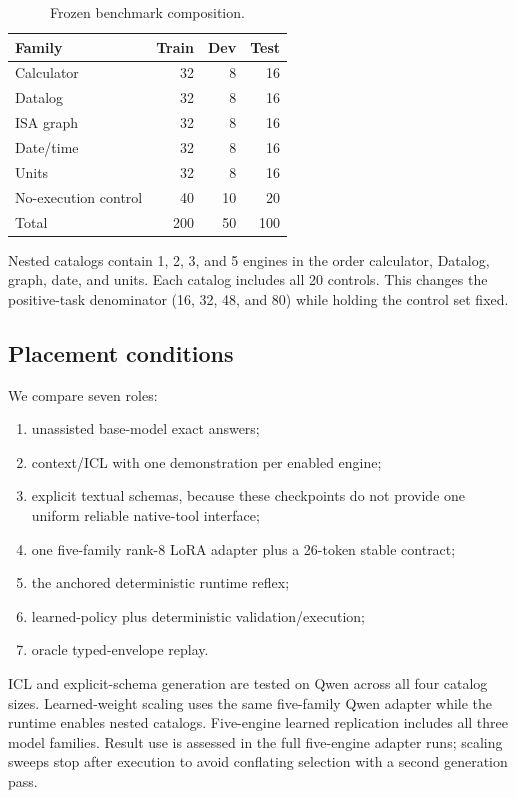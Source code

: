 \documentclass[10pt]{article}
\begin{document}
\begin{table}[ht]
\centering
\caption{Frozen benchmark composition.}
\label{tab:data}
\begin{tabular}{lrrr}
\toprule
Family & Train & Dev & Test \\
\midrule
Calculator & 32 & 8 & 16 \\
Datalog & 32 & 8 & 16 \\
ISA graph & 32 & 8 & 16 \\
Date/time & 32 & 8 & 16 \\
Units & 32 & 8 & 16 \\
No-execution control & 40 & 10 & 20 \\
\midrule
Total & 200 & 50 & 100 \\
\bottomrule
\end{tabular}
\end{table}

Nested catalogs contain 1, 2, 3, and 5 engines in the order calculator,
Datalog, graph, date, and units.  Each catalog includes all 20 controls.  This
changes the positive-task denominator (16, 32, 48, and 80) while holding the
control set fixed.

\subsection{Placement conditions}

We compare seven roles:

\begin{enumerate}
\item unassisted base-model exact answers;
\item context/ICL with one demonstration per enabled engine;
\item explicit textual schemas, because these checkpoints do not provide one
      uniform reliable native-tool interface;
\item one five-family rank-8 LoRA adapter plus a 26-token stable contract;
\item the anchored deterministic runtime reflex;
\item learned-policy plus deterministic validation/execution;
\item oracle typed-envelope replay.
\end{enumerate}

ICL and explicit-schema generation are tested on Qwen across all four catalog
sizes.  Learned-weight scaling uses the same five-family Qwen adapter while the
runtime enables nested catalogs.  Five-engine learned replication includes all
three model families.  Result use is assessed in the full five-engine adapter
runs; scaling sweeps stop after execution to avoid conflating selection with a
second generation pass.
\end{document}
